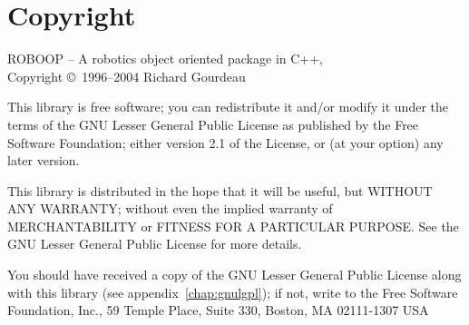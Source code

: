 
\section{Copyright}

ROBOOP -- A robotics object oriented package in C++, \\
Copyright \copyright\ 1996--2004  Richard Gourdeau


This library is free software; you can redistribute it and/or
modify it under the terms of the GNU Lesser General Public
License as published by the Free Software Foundation; either
version 2.1 of the License, or (at your option) any later version.

This library is distributed in the hope that it will be useful,
but WITHOUT ANY WARRANTY; without even the implied warranty of
MERCHANTABILITY or FITNESS FOR A PARTICULAR PURPOSE.  See the GNU
Lesser General Public License for more details.

You should have received a copy of the GNU Lesser General Public
License along with this library (see appendix~\ref{chap:gnulgpl}); if
not, write to the Free Software Foundation, Inc., 59 Temple Place,
Suite 330, Boston, MA 02111-1307 USA


